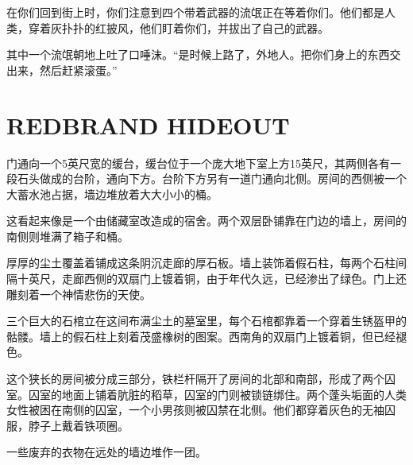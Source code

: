 \documentclass[letterpaper,twocolumn,openany,nodeprecatedcode]{dndbook}
\begin{document}
\begin{DndReadAloud}
  \begin{chinese}
    在你们回到街上时，你们注意到四个带着武器的流氓正在等着你们。他们都是人类，穿着灰扑扑的红披风，他们盯着你们，并拔出了自己的武器。

    其中一个流氓朝地上吐了口唾沫。“是时候上路了，外地人。把你们身上的东西交出来，然后赶紧滚蛋。”
    \end{chinese}
  \end{DndReadAloud}

\section{REDBRAND HIDEOUT}
\begin{DndReadAloud}
  \begin{chinese}
    门通向一个5英尺宽的缓台，缓台位于一个庞大地下室上方15英尺，其两侧各有一段石头做成的台阶，通向下方。台阶下方另有一道门通向北侧。房间的西侧被一个大蓄水池占据，墙边堆放着大大小小的桶。
  \end{chinese}
\end{DndReadAloud}

\begin{DndReadAloud}
  \begin{chinese}
    这看起来像是一个由储藏室改造成的宿舍。两个双层卧铺靠在门边的墙上，房间的南侧则堆满了箱子和桶。
  \end{chinese}
\end{DndReadAloud}

\begin{DndReadAloud}
  \begin{chinese}
    厚厚的尘土覆盖着铺成这条阴沉走廊的厚石板。墙上装饰着假石柱，每两个石柱间隔十英尺，走廊西侧的双扇门上镀着铜，由于年代久远，已经渗出了绿色。门上还雕刻着一个神情悲伤的天使。
  \end{chinese}
\end{DndReadAloud}

\begin{DndReadAloud}
  \begin{chinese}
    三个巨大的石棺立在这间布满尘土的墓室里，每个石棺都靠着一个穿着生锈盔甲的骷髅。墙上的假石柱上刻着茂盛橡树的图案。西南角的双扇门上镀着铜，但已经褪色。
  \end{chinese}
\end{DndReadAloud}

\begin{DndReadAloud}
  \begin{chinese}
    这个狭长的房间被分成三部分，铁栏杆隔开了房间的北部和南部，形成了两个囚室。囚室的地面上铺着肮脏的稻草，囚室的门则被锁链绑住。两个蓬头垢面的人类女性被困在南侧的囚室，一个小男孩则被囚禁在北侧。他们都穿着灰色的无袖囚服，脖子上戴着铁项圈。

    一些废弃的衣物在远处的墙边堆作一团。
  \end{chinese}
\end{DndReadAloud}
\end{document}
